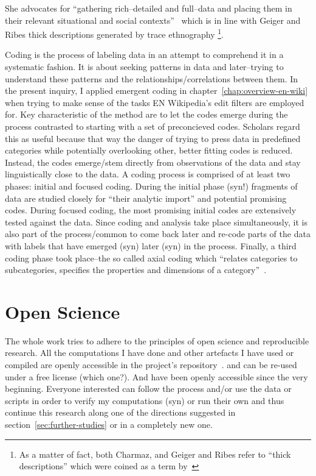 She advocates for ``gathering rich–detailed and full–data and placing them in their relevant situational and social contexts''~\cite[p.10-11]{Charmaz2006} which is in line with Geiger and Ribes thick descriptions generated by trace ethnography
\footnote{As a matter of fact, both Charmaz, and Geiger and Ribes refer to ``thick descriptions'' which were coined as a term by~\cite{Geertz1973}}.

Coding is the process of labeling data in an attempt to comprehend it in a systematic fashion.
It is about seeking patterns in data and later–trying to understand these patterns and the relationships/correlations between them.
In the present inquiry, I applied emergent coding in chapter~\ref{chap:overview-en-wiki} when trying to make sense of the tasks EN Wikipedia's edit filters are employed for.
Key characteristic of the method are to let the codes emerge during the process contrasted to starting with a set of preconcieved codes.
Scholars regard this as useful because that way the danger of trying to press data in predefined categories while potentially overlooking other, better fitting codes is reduced.
Instead, the codes emerge/stem directly from observations of the data and stay linguistically close to the data.
A coding process is comprised of at least two phases: initial and focused coding.
During the initial phase (syn!) fragments of data are studied closely for ``their analytic import'' and potential promising codes.
During focused coding, the most promising initial codes are extensively tested against the data.
Since coding and analysis take place simultaneously, it is also part of the process/common to come back later and re-code parts of the data with labels that have emerged (syn) later (syn) in the process.
Finally, a third coding phase took place–the so called axial coding which ``relates categories to subcategories, specifies the properties and dimensions of a category''~\cite[p.60]{Charmaz2006}. %


\section{Open Science}

The whole work tries to adhere to the principles of open science and reproducible research. %
All the computations I have done and other artefacts I have used or compiled are openly accessible in the project's repository~\cite{github}.
and can be re-used under a free license (which one?).
And have been openly accessible since the very beginning.
Everyone interested can follow the process and/or use the data or scripts in order to verify my computations (syn) or run their own and thus continue this research along one of the directions suggested in section~\ref{sec:further-studies} or in a completely new one.

